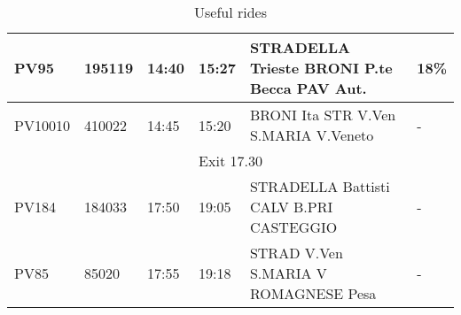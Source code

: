 \begin{landscape}
\begin{table}[ht]
\begin{tabular}{|llllll|}
\multicolumn{1}{|l|}{PV95}          & \multicolumn{1}{l|}{195119}                                    & \multicolumn{1}{l|}{14:40}                                            & \multicolumn{1}{l|}{15:27}                                        & \multicolumn{1}{l|}{STRADELLA Trieste   BRONI   P.te Becca   PAV Aut.}    & 18\%                                                       \\ \hline
\multicolumn{1}{|l|}{PV10010}       & \multicolumn{1}{l|}{410022}                                    & \multicolumn{1}{l|}{14:45}                                            & \multicolumn{1}{l|}{15:20}                                        & \multicolumn{1}{l|}{BRONI Ita   STR V.Ven   S.MARIA V.Veneto}             & -                                                          \\ \hline
\multicolumn{6}{|c|}{Exit 17.30}                                                                                                                                                                                                                                                                                                                                                          \\ \hline
\multicolumn{1}{|l|}{PV184}         & \multicolumn{1}{l|}{184033}                                    & \multicolumn{1}{l|}{17:50}                                            & \multicolumn{1}{l|}{19:05}                                        & \multicolumn{1}{l|}{STRADELLA Battisti   CALV B.PRI   CASTEGGIO}          & -                                                          \\ \hline
\multicolumn{1}{|l|}{PV85}          & \multicolumn{1}{l|}{85020}                                     & \multicolumn{1}{l|}{17:55}                                            & \multicolumn{1}{l|}{19:18}                                        & \multicolumn{1}{l|}{STRAD V.Ven   S.MARIA V   ROMAGNESE Pesa}             & -                                                          \\ \hline
\end{tabular}
\caption{Useful rides}
\label{tab:loads}
\end{table}
\end{landscape}
\newpage